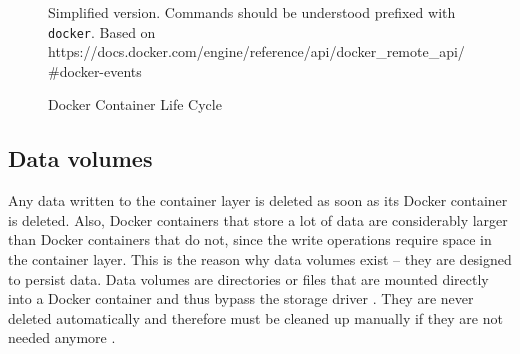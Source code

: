     \begin{figure}[htbp]
      \centering
      \caption*{Simplified version. Commands should be understood prefixed with \texttt{docker}. \newline \scriptsize Based on https://docs.docker.com/engine/reference/api/docker\_remote\_api/\#docker-events }
      \caption[Docker Container Life Cycle]{Docker Container Life Cycle \cite{Docker2016Docker}}
      \label{fig:docker_container_lifecycle}
    \end{figure}


  \subsection{Data volumes} %
  \label{sub:data_volumes}
    Any data written to the container layer is deleted as soon as its Docker container is deleted.
    Also, Docker containers that store a lot of data are considerably larger than Docker containers that do not, since the write operations require space in the container layer. This is the reason why data volumes exist -- they are designed to persist data. Data volumes are directories or files that are mounted directly into a Docker container and thus bypass the storage driver \cite{Docker2016Docker}. They are never deleted automatically and therefore must be cleaned up manually if they are not needed anymore \cite{Docker2016Docker}.

